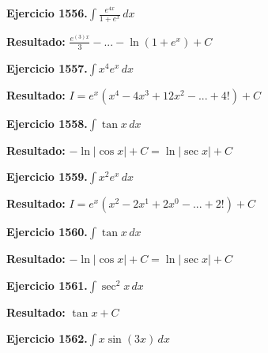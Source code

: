 \documentclass[10pt,a4paper]{article}
\begin{document}
\begin{ejbox}
\textbf{Ejercicio 1556.}\quad $\int \frac{e^{4x}}{1+e^{x}}\,dx$
\end{ejbox}

\begin{solbox}
\textbf{Resultado:} \(\displaystyle \frac{e^{(3)x}}{3} - ... - \ln(1+e^x) + C\)
\end{solbox}

\begin{ejbox}
\textbf{Ejercicio 1557.}\quad $\int x^{4} e^x\,dx$
\end{ejbox}

\begin{solbox}
\textbf{Resultado:} \(\displaystyle I = e^x(x^{4} - 4x^{3} + 12x^{2} - ... + 4!) + C\)
\end{solbox}

\newpage
\begin{ejbox}
\textbf{Ejercicio 1558.}\quad $\int \tan x\,dx$
\end{ejbox}

\begin{solbox}
\textbf{Resultado:} \(\displaystyle -\ln|\cos x| + C = \ln|\sec x| + C\)
\end{solbox}

\begin{ejbox}
\textbf{Ejercicio 1559.}\quad $\int x^{2} e^x\,dx$
\end{ejbox}

\begin{solbox}
\textbf{Resultado:} \(\displaystyle I = e^x(x^{2} - 2x^{1} + 2x^{0} - ... + 2!) + C\)
\end{solbox}

\begin{ejbox}
\textbf{Ejercicio 1560.}\quad $\int \tan x\,dx$
\end{ejbox}

\begin{solbox}
\textbf{Resultado:} \(\displaystyle -\ln|\cos x| + C = \ln|\sec x| + C\)
\end{solbox}

\newpage
\begin{ejbox}
\textbf{Ejercicio 1561.}\quad $\int \sec^2 x\,dx$
\end{ejbox}

\begin{solbox}
\textbf{Resultado:} \(\displaystyle \tan x + C\)
\end{solbox}

\begin{ejbox}
\textbf{Ejercicio 1562.}\quad $\int x \sin(3x)\,dx$
\end{ejbox}
\end{document}
